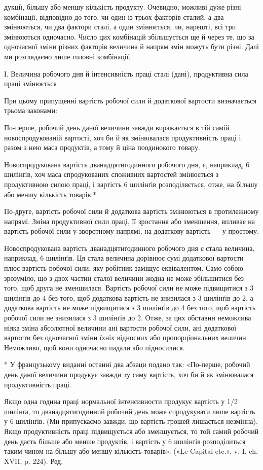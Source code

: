 дукції, більшу або меншу кількість продукту. Очевидно, можливі
дуже різні комбінації, відповідно до того, чи один із трьох факторів
сталий, а два змінюються, чи два фактори сталі, а один
змінюється, чи, нарешті, всі три змінюються одночасно. Число
цих комбінацій збільшується ще й через те, що за одночасної
зміни різних факторів величина й напрям змін можуть бути
різні. Далі ми розглядаємо лише головні комбінації.

І. Величина робочого дня й інтенсивність праці сталі (дані),
продуктивна сила праці змінюється

При цьому припущенні вартість робочої сили й додаткової
вартости визначається трьома законами:

По-перше, робочий день даної величини завжди виражається
в тій самій новоспродукованій вартості, хоч би й як змінювалася
продуктивність праці і разом з нею маса продуктів, а тому й
ціна поодинокого товару.

Новоспродукована вартість дванадцятигодинного робочого
дня, є, наприклад, 6 шилінґів, хоч маса спродукованих споживних
вартостей змінюється з продуктивною силою праці, і вартість
6 шилінґів розподіляється, отже, на більшу або меншу кількість
товарів.*

По-друге, вартість робочої сили й додаткова вартість змінюються
в протилежному напрямі. Зміна продуктивної сили праці,
її зростання або зменшення, впливає на вартість робочої сили у
зворотному напрямі, на додаткову вартість — у простому.

Новоспродукована вартість дванадцятигодинного робочого
дня є стала величина, наприклад, 6 шилінґів. Ця стала величина
дорівнює сумі додаткової вартости плюс вартість робочої сили,
яку робітник заміщує еквівалентом. Само собою зрозуміло, що
з двох частин сталої величини жодна не може збільшитися без
того, щоб друга не зменшилася. Вартість робочої сили не може
підвищитися з 3 шилінґів до 4 без того, щоб додаткова вартість
не знизилася з 3 шилінґів до 2, а додаткова вартість не може
підвищитися з 3 шилінґів до 4 без того, щоб вартість робочої
сили не знизилася з 3 шилінґів до 2. Отже, за цих обставин неможлива
ніяка зміна абсолютної величини ані вартости робочої
сили, ані додаткової вартости без одночасної зміни їхніх відносних
або пропорціональних величин. Неможливо, щоб вони одночасно
падали або підносилися.

* У французькому виданні останні два абзаци подано так: «По-перше,
робочий день даної величини продукує завжди ту саму вартість,
хоч би й як змінювалася продуктивність праці.

Якщо одна година праці нормальної інтенсивности продукує вартість
у 1/2 шилінґа, то дванадцятигодинний робочий день може спродукувати
лише вартість у 6 шилінґів. (Ми припускаємо завжди, що вартість грошей
лишається незмінна). Якщо продуктивність праці підвищується або зменшується,
то той самий робочий день дасть більше або менше продуктів,
і вартість у 6 шилінґів розподілиться таким чином на більшу або меншу
кількість товарів». («Le Capital etc.», v. I, ch. XVII, p. 224). Ред.
